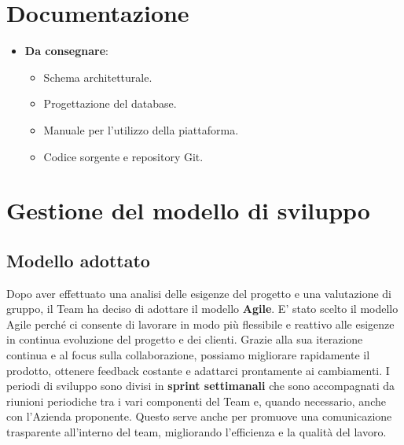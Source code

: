 \documentclass{article}
\begin{document}
\section{Documentazione}  %
\begin{itemize}
    \item \textbf{Da consegnare}:
    \begin{itemize}
        \item Schema architetturale.  %
        \item Progettazione del database.
        \item Manuale per l'utilizzo della piattaforma.
        \item Codice sorgente e repository Git.
    \end{itemize}
\end{itemize}



\newpage
\section{Gestione del modello di sviluppo}
    \subsection{Modello adottato}
    Dopo aver effettuato una analisi delle esigenze del progetto e una valutazione
    di gruppo, il Team ha deciso di adottare il modello \textbf{Agile}. E' stato scelto il 
    modello Agile perché ci consente di lavorare in modo più flessibile e reattivo 
    alle esigenze in continua evoluzione del progetto e dei clienti. Grazie alla sua 
    iterazione continua e al focus sulla collaborazione, possiamo migliorare rapidamente 
    il prodotto, ottenere feedback costante e adattarci prontamente ai cambiamenti. 
    I periodi di sviluppo sono divisi in \textbf{sprint settimanali} che sono accompagnati da riunioni
    periodiche tra i vari componenti del Team e, quando necessario, anche con l'Azienda proponente.
    Questo serve anche per promuove una comunicazione trasparente all'interno del team, 
    migliorando l'efficienza e la qualità del lavoro.
\end{document}
